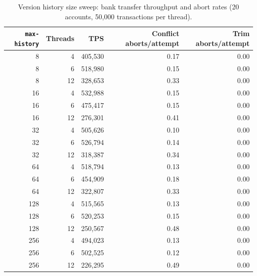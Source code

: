 \begin{table}[H]
  \centering
  \caption{Version history size sweep: bank transfer throughput and abort
    rates (20 accounts, 50{,}000 transactions per thread).}
  \label{tab:history-sweep}
  \begin{tabular}{@{}r r r r r@{}}
    \toprule
    \textbf{\texttt{max-history}}    & \textbf{Threads}             & \textbf{TPS} &
    \textbf{Conflict aborts/attempt} & \textbf{Trim aborts/attempt}                              \\
    \midrule
    8                                & 4                            & 405,530      & 0.17 & 0.00 \\
    8                                & 6                            & 518,980      & 0.15 & 0.00 \\
    8                                & 12                           & 328,653      & 0.33 & 0.00 \\
    \midrule
    16                               & 4                            & 532,988      & 0.15 & 0.00 \\
    16                               & 6                            & 475,417      & 0.15 & 0.00 \\
    16                               & 12                           & 276,301      & 0.41 & 0.00 \\
    \midrule
    32                               & 4                            & 505,626      & 0.10 & 0.00 \\
    32                               & 6                            & 526,794      & 0.14 & 0.00 \\
    32                               & 12                           & 318,387      & 0.34 & 0.00 \\
    \midrule
    64                               & 4                            & 518,794      & 0.13 & 0.00 \\
    64                               & 6                            & 454,909      & 0.18 & 0.00 \\
    64                               & 12                           & 322,807      & 0.33 & 0.00 \\
    \midrule
    128                              & 4                            & 515,565      & 0.13 & 0.00 \\
    128                              & 6                            & 520,253      & 0.15 & 0.00 \\
    128                              & 12                           & 250,567      & 0.48 & 0.00 \\
    \midrule
    256                              & 4                            & 494,023      & 0.13 & 0.00 \\
    256                              & 6                            & 502,525      & 0.12 & 0.00 \\
    256                              & 12                           & 226,295      & 0.49 & 0.00 \\
    \bottomrule
  \end{tabular}
\end{table}

